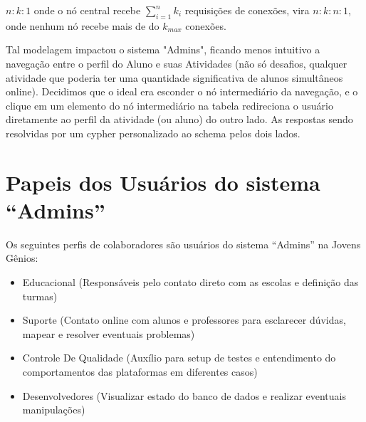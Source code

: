 \(n:k:1\) onde o nó central recebe \(\sum_{i=1}^n k_i\) requisições de conexões, vira \(n:k:n:1\), onde nenhum nó recebe mais de do \(k_{max}\) conexões.

Tal modelagem impactou o sistema "Admins", ficando menos intuitivo a navegação entre o perfil do Aluno e suas Atividades (não só desafios, qualquer atividade que poderia ter uma quantidade significativa de alunos simultâneos online). Decidimos que o ideal era esconder o nó intermediário da navegação, e o clique em um elemento do nó intermediário na tabela redireciona o usuário diretamente ao perfil da atividade (ou aluno) do outro lado. As respostas sendo resolvidas por um cypher personalizado ao schema pelos dois lados.

\section{Papeis dos Usuários do sistema ``Admins''}

Os seguintes perfis de colaboradores são usuários do sistema ``Admins'' na Jovens Gênios:

\begin{itemize}
    \item Educacional (Responsáveis pelo contato direto com as escolas e definição das turmas)
    \item Suporte (Contato online com alunos e professores para esclarecer dúvidas, mapear e resolver eventuais problemas)
    \item Controle De Qualidade (Auxílio para setup de testes e entendimento do comportamentos das plataformas em diferentes casos)
    \item Desenvolvedores (Visualizar estado do banco de dados e realizar eventuais manipulações)
\end{itemize}
